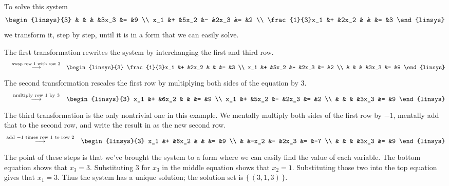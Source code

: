 \begin{example}
To solve this system
\begin{equation*}
  \begin{linsys}{3}
                     &   &      &   &3x_3  &=  &9  \\
                 x_1 &+  &5x_2  &-  &2x_3  &=  &2  \\
      \frac{1}{3}x_1 &+  &2x_2  &   &      &=  &3  
  \end{linsys}
\end{equation*}
we transform it, step by step, until it is in a form that
we can easily solve.

The first transformation
rewrites the system by interchanging the first and third row.
\begin{eqnarray*}
  \quad
  &\grstep{ \text{swap row 1 with row 3} }
  &\begin{linsys}{3}
        \frac{1}{3}x_1 &+  &2x_2  &   &      &=  &3  \\
                   x_1 &+  &5x_2  &-  &2x_3  &=  &2  \\
                       &   &      &   &3x_3  &=  &9  
    \end{linsys}                                         
\end{eqnarray*}
The second transformation rescales the first row by multiplying
both sides of the equation by $3$.
\begin{eqnarray*}
\quad
  &\grstep{ \text{multiply row 1 by 3} }
  &\begin{linsys}{3}
        x_1 &+  &6x_2  &   &      &=  &9  \\
        x_1 &+  &5x_2  &-  &2x_3  &=  &2  \\
            &   &      &   &3x_3  &=  &9  
   \end{linsys}                                          
\end{eqnarray*}
The third transformation is the only nontrivial one in this example.
We mentally multiply both sides of the first row by \( -1 \),
mentally add that to the second row,
and write the result in as the new second row.
\begin{eqnarray*}
  &\grstep{ \text{add \(-1\) times row 1 to row 2} }
  &\begin{linsys}{3}
        x_1 &+  &6x_2  &   &      &=  &9  \\
            &   &-x_2  &-  &2x_3  &=  &-7 \\
            &   &      &   &3x_3  &=  &9  
   \end{linsys}
\end{eqnarray*}
The point of these steps is that we've brought the system to a
form where we can easily find the value of each variable.
The bottom equation shows that \( x_3=3 \).
Substituting $3$ for \( x_3 \) in the middle equation shows that \( x_2=1 \).
Substituting those two into the top equation
gives that \( x_1=3 \). 
Thus the system has a unique solution; 
the solution set is $\{\,(3,1,3)\,\}$.
\end{example}

